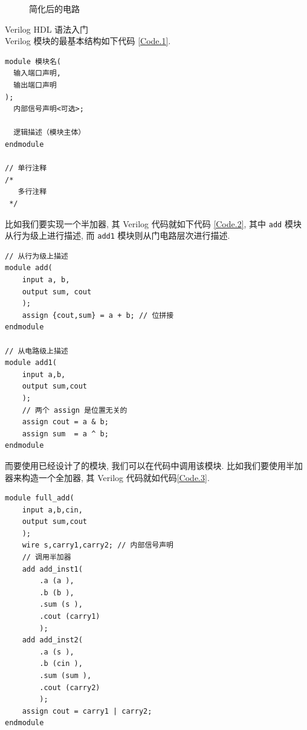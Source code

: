\documentclass[UTF8,fontset=fandol]{ctexart}
\begin{document}
\begin{ExSteps}
  \begin{figure}[H]
    \centering
    \caption{简化后的电路}
    \label{Fig.3}
  \end{figure}
\newpage
  \step Verilog HDL 语法入门 \\
  Verilog 模块的最基本结构如下代码 \ref{Code.1}.
  \begin{lstlisting}[style=verilogstyle, caption={Verilog模块基本结构}, label={Code.1}]
module 模块名(
  输入端口声明,
  输出端口声明
);
  内部信号声明<可选>;

  逻辑描述（模块主体）
endmodule

// 单行注释
/*
   多行注释
 */
  \end{lstlisting}
比如我们要实现一个半加器, 其 Verilog 代码就如下代码 \ref{Code.2}, 其中 \texttt{add} 模块从行为级上进行描述, 而 \texttt{add1} 模块则从门电路层次进行描述.
\begin{lstlisting}[style=verilogstyle, caption={半加器模块}, label={Code.2}]
  // 从行为级上描述
module add(
    input a, b,
    output sum, cout
    );
    assign {cout,sum} = a + b; // 位拼接
endmodule

// 从电路级上描述
module add1(
    input a,b,
    output sum,cout
    );
    // 两个 assign 是位置无关的
    assign cout = a & b;
    assign sum  = a ^ b;
endmodule
    \end{lstlisting}
    而要使用已经设计了的模块, 我们可以在代码中调用该模块. 比如我们要使用半加器来构造一个全加器, 其 Verilog 代码就如代码\ref{Code.3}.
    \newpage
    \begin{lstlisting}[style=verilogstyle, caption={全加器}, label={Code.3}]
module full_add(
    input a,b,cin,
    output sum,cout
    );
    wire s,carry1,carry2; // 内部信号声明
    // 调用半加器
    add add_inst1( 
        .a (a ),
        .b (b ),
        .sum (s ),
        .cout (carry1)
        );
    add add_inst2(
        .a (s ),
        .b (cin ),
        .sum (sum ),
        .cout (carry2)
        );
    assign cout = carry1 | carry2;
endmodule
    \end{lstlisting}
  \end{ExSteps}
\end{document}
